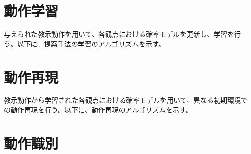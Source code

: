 \section{動作学習}

与えられた教示動作を用いて、各観点における確率モデルを更新し、学習を行う。以下に、提案手法の学習のアルゴリズムを示す。



\section{動作再現}

教示動作から学習された各観点における確率モデルを用いて、異なる初期環境での動作再現を行う。以下に、動作再現のアルゴリズムを示す。

\section{動作識別}

